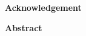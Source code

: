 \documentclass[a4paper,11pt]{report}
\begin{document}
\newpage
\vspace*{3cm}
{\center \textbf {Acknowledgement}\\}

\vspace{0.5cm}
\newpage

\vspace*{2cm}
{\center \textbf {Abstract}\\}
\vspace{1cm}
\noindent    

\end{document}
